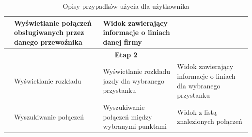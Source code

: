 \documentclass[10pt,a4paper]{article}
\begin{document}
\begin{table}[H]
\begin{tabularx}{\textwidth}{|c|X|X|X|}
		& Wyświetlanie połączeń obsługiwanych przez danego przewoźnika
		& Widok zawierający informacje o liniach danej firmy \\
		\hline
		\multicolumn{4}{|c|}{\textbf{Etap 2}} \\
		\hline
		\multirow{5}{*}{\rotatebox[origin=c]{90}{Pracownik}}
		& Wyświetlanie rozkładu
		& Wyświetlanie rozkładu jazdy dla wybranego przystanku
		& Widok zawierający informacje o liniach dla wybranego przystanku \\
		\cline{2-4}
		& Wyszukiwanie połączeń
		& Wyszukiwanie połączeń między wybranymi punktami
		& Widok z listą znalezionych połączeń \\
		\hline
	\end{tabularx}
	\caption{Opisy przypadków użycia dla użytkownika}
\end{table}
\end{document}
